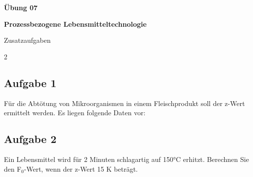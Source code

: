 \documentclass[a4paper,10pt]{article}
\newif\ifshowme
\begin{document}


\begin{center}
\LARGE
\color{uniblau}
\textbf{Übung 07} \par \vspace*{2mm}
\large \color{miugray!50!black} \textbf{Prozessbezogene Lebensmitteltechnologie}\par 
\normalsize Zusatzaufgaben
\end{center}
\par 


\color{miudiutex}

\begin{multicols}{2}
\subsection*{Aufgabe 1}
Für die Abtötung von Mikroorganismen in einem Fleischprodukt soll der z-Wert ermittelt
werden. Es liegen folgende Daten vor:
\pp
\begin{center}
\end{center}

\ifshowme
\antwort{
\begin{align*}
D_1 &= D_2 \cdot 10^{\frac{T_2-T_1}{z}} \\
\log(\frac{D_1}{D_2}) &= \frac{T_2-T_1}{z} \\
z &= \frac{T_2 - T_1}{\log(\frac{D_1}{D_2})} \\
z &= \frac{65 - 50}{\log(\frac{180}{5})} \\ 
 &= 9,64  ~\text{°C}
\end{align*}
}
\else
\ppbig \vspace*{1cm}
\fi



\subsection*{Aufgabe 2}
Ein Lebensmittel wird für 2 Minuten schlagartig auf 150°C erhitzt. Berechnen Sie den F$_0$-Wert, wenn der z-Wert 15 K beträgt.
\ifshowme
\antwort{
\begin{align*}
F_1 &= F_2 \cdot 10^{\frac{T_2-T_1}{z}} \\
F_1 &= 2 ~\text{min} \cdot 10^{\frac{150-121,1}{15}} \\
 &= 168,926 ~\text{min}
\end{align*}
}
\else
\ppbig \vspace*{1cm}
\fi



\end{multicols}
\end{document}
